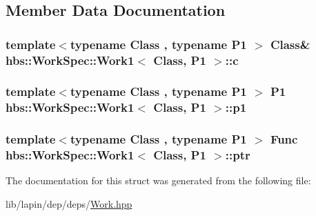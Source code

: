 \subsection{Member Data Documentation}
\hypertarget{structhbs_1_1_work_spec_1_1_work1_a8b8aff633b8cf8ffdff68d89aa3d722d}{
\subsubsection[{c}]{\setlength{\rightskip}{0pt plus 5cm}template$<$typename Class , typename P1 $>$ Class\& {\bf hbs\-::\-Work\-Spec\-::\-Work1}$<$ Class, P1 $>$\-::c}}\label{structhbs_1_1_work_spec_1_1_work1_a8b8aff633b8cf8ffdff68d89aa3d722d}
\hypertarget{structhbs_1_1_work_spec_1_1_work1_ab06fc99d119bd4db78a0755de8bce3a5}{
\subsubsection[{p1}]{\setlength{\rightskip}{0pt plus 5cm}template$<$typename Class , typename P1 $>$ P1 {\bf hbs\-::\-Work\-Spec\-::\-Work1}$<$ Class, P1 $>$\-::p1}}\label{structhbs_1_1_work_spec_1_1_work1_ab06fc99d119bd4db78a0755de8bce3a5}
\hypertarget{structhbs_1_1_work_spec_1_1_work1_aae1ee8d342b1492d889253439d256b83}{
\subsubsection[{ptr}]{\setlength{\rightskip}{0pt plus 5cm}template$<$typename Class , typename P1 $>$ {\bf Func} {\bf hbs\-::\-Work\-Spec\-::\-Work1}$<$ Class, P1 $>$\-::ptr}}\label{structhbs_1_1_work_spec_1_1_work1_aae1ee8d342b1492d889253439d256b83}


The documentation for this struct was generated from the following file\-:\begin{DoxyCompactItemize}
\item 
lib/lapin/dep/deps/\hyperlink{_work_8hpp}{Work.\-hpp}\end{DoxyCompactItemize}
